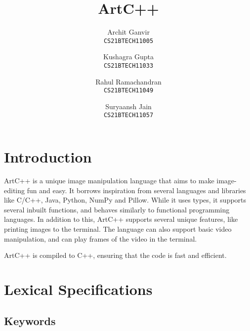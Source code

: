 \documentclass[a4paper, 11pt]{article}
\title{ArtC++}
\author{
  Archit Ganvir \\
  \texttt{CS21BTECH11005}
  \and
  Kushagra Gupta \\
  \texttt{CS21BTECH11033}
  \and
  Rahul Ramachandran\\
  \texttt{CS21BTECH11049}
  \and
  Suryaansh Jain\\
  \texttt{CS21BTECH11057}
}
\date{}
\begin{document}
\maketitle
\tableofcontents

\section{Introduction}

ArtC++ is a unique image manipulation language that aims to make image-editing fun and easy. It borrows inspiration from several languages and libraries like C/C++, Java, Python, NumPy and Pillow. While it uses types, it supports several inbuilt functions, and behaves similarly to functional programming languages. 
In addition to this, ArtC++ supports several unique features, like printing images to the terminal. The language can also support basic video manipulation, and can play frames of the video in the terminal.

ArtC++ is compiled to C++, ensuring that the code is fast and efficient.

\section{Lexical Specifications}
  \subsection{Keywords}
\end{document}
